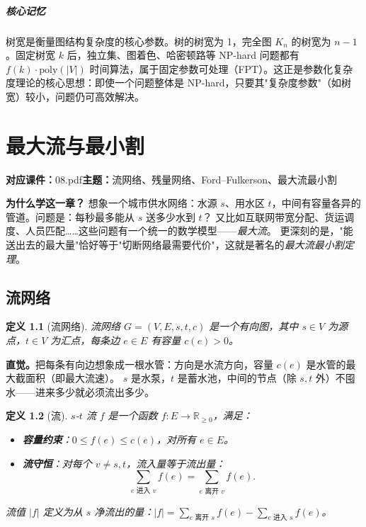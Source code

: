 \documentclass[UTF8,openany,12pt]{ctexbook}
\newtheorem{definition}{定义}[chapter]
\theoremstyle{remark}
\newcommand{\lecture}[3]{
  \chapter{#2}
  \noindent\textbf{对应课件：}#1\hfill\textbf{主题：}#3
  \vspace{0.6em}
}
\newcommand{\keypoint}[1]{\paragraph{核心记忆}#1}
\newcommand{\poly}{\mathrm{poly}}
\newcommand{\NP}{\mathrm{NP}}
\begin{document}
\keypoint{树宽是衡量图结构复杂度的核心参数。树的树宽为 1，完全图 $K_n$ 的树宽为 $n-1$。固定树宽 $k$ 后，独立集、图着色、哈密顿路等 $\NP$-hard 问题都有 $f(k) \cdot \poly(|V|)$ 时间算法，属于固定参数可处理（FPT）。这正是参数化复杂度理论的核心思想：即使一个问题整体是 $\NP$-hard，只要其"复杂度参数"（如树宽）较小，问题仍可高效解决。}


\lecture{08.pdf}{最大流与最小割}{流网络、残量网络、Ford--Fulkerson、最大流最小割}

\noindent
\textbf{为什么学这一章？}
想象一个城市供水网络：水源 $s$、用水区 $t$，中间有容量各异的管道。问题是：每秒最多能从 $s$ 送多少水到 $t$？
又比如互联网带宽分配、货运调度、人员匹配……这些问题有一个统一的数学模型——\emph{最大流}。
更深刻的是，"能送出去的最大量"恰好等于"切断网络最需要代价"，这就是著名的\emph{最大流最小割定理}。

\section{流网络}

\begin{definition}[流网络]
流网络 $G=(V,E,s,t,c)$ 是一个有向图，其中
$s\in V$ 为源点，$t\in V$ 为汇点，每条边 $e\in E$ 有容量 $c(e)>0$。
\end{definition}

\noindent\textbf{直觉。}把每条有向边想象成一根水管：方向是水流方向，容量 $c(e)$ 是水管的最大截面积（即最大流速）。
$s$ 是水泵，$t$ 是蓄水池，中间的节点（除 $s,t$ 外）不囤水——进来多少就必须流出多少。

\begin{definition}[流]
$s$-$t$ 流 $f$ 是一个函数 $f: E\to\mathbb{R}_{\ge 0}$，满足：
\begin{itemize}
  \item \textbf{容量约束}：$0\le f(e)\le c(e)$，对所有 $e\in E$。
  \item \textbf{流守恒}：对每个 $v\ne s,t$，流入量等于流出量：
        \[
          \sum_{e\text{ 进入 }v}f(e) = \sum_{e\text{ 离开 }v}f(e).
        \]
\end{itemize}
流值 $|f|$ 定义为从 $s$ 净流出的量：$|f|=\sum_{e\text{ 离开 }s}f(e)-\sum_{e\text{ 进入 }s}f(e)$。
\end{definition}
\end{document}
